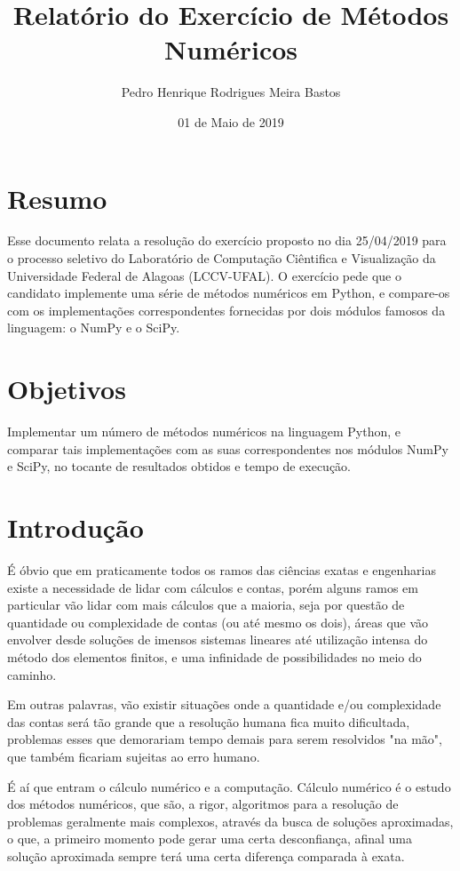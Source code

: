 \documentclass[12pt,A4]{report}
\title{Relatório do Exercício de Métodos Numéricos}
\author{Pedro Henrique Rodrigues Meira Bastos}
\date{01 de Maio de 2019}
\begin{document}
\maketitle
\tableofcontents
\newpage

\section{Resumo}
Esse documento relata a resolução do exercício proposto no dia 25/04/2019 para o processo seletivo do Laboratório de Computação Ciêntifica e Visualização da Universidade Federal de Alagoas (LCCV-UFAL). O exercício pede que o candidato implemente uma série de métodos numéricos em Python, e compare-os com os implementações correspondentes fornecidas por dois módulos famosos da linguagem: o NumPy e o SciPy.

\section{Objetivos}
Implementar um número de métodos numéricos na linguagem Python, e comparar tais implementações com as suas correspondentes nos módulos NumPy e SciPy, no tocante de resultados obtidos e tempo de execução.

\newpage

\section{Introdução}
É óbvio que em praticamente todos os ramos das ciências exatas e engenharias existe a necessidade de lidar com cálculos e contas, porém alguns ramos em particular vão lidar com mais cálculos que a maioria, seja por questão de quantidade ou complexidade de contas (ou até mesmo os dois), áreas que vão envolver desde soluções de imensos sistemas lineares até utilização intensa do método dos elementos finitos, e uma infinidade de possibilidades no meio do caminho.

Em outras palavras, vão existir situações onde a quantidade e/ou complexidade das contas será tão grande que a resolução humana fica muito dificultada, problemas esses que demorariam tempo demais para serem resolvidos "na mão", que também ficariam sujeitas ao erro humano.

É aí que entram o cálculo numérico e a computação. Cálculo numérico é o estudo dos métodos numéricos, que são, a rigor, algoritmos para a resolução de problemas geralmente mais complexos, através da busca de soluções aproximadas, o que, a primeiro momento pode gerar uma certa desconfiança, afinal uma solução aproximada sempre terá uma certa diferença comparada à exata.
\end{document}
